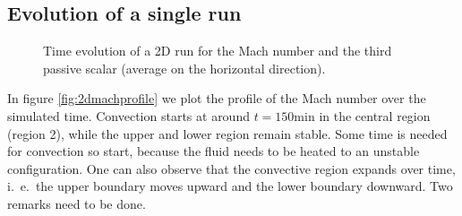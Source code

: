\subsection{Evolution of a single run}
\begin{figure}[t!]
      \centering
     \centering
	\hfill
	\caption{Time evolution of a 2D run for the Mach number and the third passive scalar (average on the horizontal direction).}
	\label{fig:2dsinglefirst}
\end{figure}
In figure \ref{fig:2dmachprofile} we plot the profile of the Mach number over the simulated time. Convection starts at around $t=150 \mathrm{min}$ in the central region (region 2), while the upper and lower region remain stable. Some time is needed for convection so start, because the fluid needs to be heated to an unstable configuration. One can also observe that the convective region expands over time, i.\ e.\ the upper boundary moves upward and the lower boundary downward. Two remarks need to be done. 

